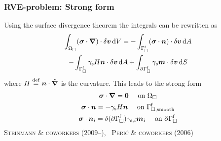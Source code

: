 \documentclass[11pt]{beamer} %
\newcommand{\free}{\mathrm{f}}
\newcommand{\surf}{\mathrm{s}}
\newcommand{\dirac}{\delta}
\newcommand{\on}{\quad\text{ on }}
\newcommand{\roughcite}[1]{\textsc{#1}}
\begin{document}
\begin{frame}
 \frametitle{RVE-problem: Strong form}
 Using the surface divergence theorem %
 the integrals can be rewritten as
\begin{multline*}
 \int_{\Omega_\Box} (\ts\sigma\cdot\diff)\cdot \delta\ta v \dif V =
  -\int_{\Gamma_\Box^\free} (\ts\sigma\cdot\ta n)\cdot\delta\ta v\dif A\\
  -\int_{\Gamma_\Box^\free} \gamma_\surf H \ta n \cdot \delta\ta v \dif A
  +\int_{\partial\Gamma_\Box^\free} \gamma_\surf \ta m\cdot \delta\ta v \dif S
\end{multline*}
where $H\overset{\mathrm{def}}{=} \boldsymbol{n} \cdot \tilde{\boldsymbol{\nabla}}$ is the curvature.
This leads to the strong form
\begin{gather*}
 \ts\sigma\cdot\diff = \ts 0 \on \Omega_\Box\\
 \ts\sigma\cdot\ta n = -\gamma_\surf H \ta n \on \Gamma_{\Box,\mathrm{smooth}}^\free\\
 \ts\sigma\cdot\ta n_i = \dirac(\partial\Gamma_\Box^\free)\gamma_{\surf,i} \ta m_i \on \partial\Gamma_{\Box}^\free \label{eq:singular}
\end{gather*}
\roughcite{Steinmann \& coworkers (2009--)}, \, \roughcite{Perić \& coworkers (2006)}
\end{frame}

% 
% 
\end{document}
